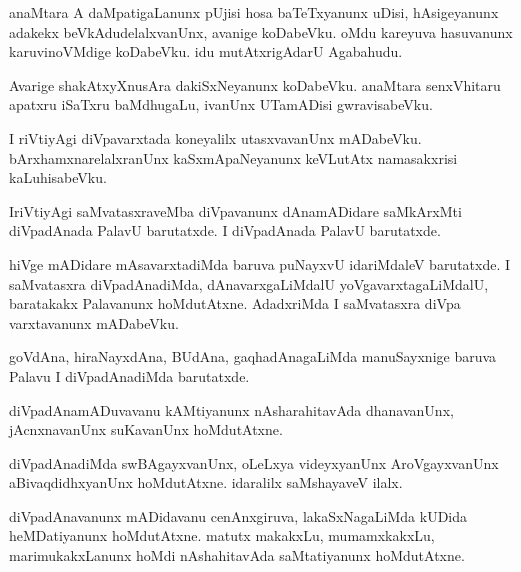 \documentclass{article}
\begin{document}
\begin{mn}%
anaMtara A daMpatigaLanunx pUjisi hosa baTeTxyanunx uDisi, hAsigeyanunx adakekx 
beVkAdudelalxvanUnx, avanige koDabeVku. oMdu kareyuva hasuvanunx karuvinoVMdige koDabeVku. idu 
mutAtxrigAdarU Agabahudu.
\end{mn}

\begin{mn}%
Avarige shakAtxyXnusAra dakiSxNeyanunx koDabeVku. anaMtara senxVhitaru apatxru iSaTxru baMdhugaLu, 
ivanUnx UTamADisi gwravisabeVku.
\end{mn}

\begin{mn}%
I riVtiyAgi diVpavarxtada koneyalilx utasxvavanUnx mADabeVku. bArxhamxnarelalxranUnx 
kaSxmApaNeyanunx keVLutAtx namasakxrisi kaLuhisabeVku.
\end{mn}

\begin{mn}%
IriVtiyAgi saMvatasxraveMba diVpavanunx dAnamADidare saMkArxMti diVpadAnada PalavU barutatxde. I 
diVpadAnada PalavU barutatxde.
\end{mn}

\begin{mn}%
hiVge mADidare mAsavarxtadiMda baruva puNayxvU idariMdaleV barutatxde. I saMvatasxra 
diVpadAnadiMda, dAnavarxgaLiMdalU yoVgavarxtagaLiMdalU, baratakakx Palavanunx hoMdutAtxne. 
AdadxriMda I saMvatasxra diVpa varxtavanunx mADabeVku.
\end{mn}

\begin{mn}%
goVdAna, hiraNayxdAna, BUdAna, gaqhadAnagaLiMda manuSayxnige baruva Palavu I diVpadAnadiMda 
barutatxde.
\end{mn}

\begin{mn}%
diVpadAnamADuvavanu kAMtiyanunx nAsharahitavAda dhanavanUnx, jAcnxnavanUnx suKavanUnx hoMdutAtxne.
\end{mn}

\begin{mn}%
diVpadAnadiMda swBAgayxvanUnx, oLeLxya videyxyanUnx AroVgayxvanUnx aBivaqdidhxyanUnx hoMdutAtxne. 
idaralilx saMshayaveV ilalx.
\end{mn}

\begin{mn}%
diVpadAnavanunx mADidavanu cenAnxgiruva, lakaSxNagaLiMda kUDida heMDatiyanunx hoMdutAtxne. matutx 
makakxLu, mumamxkakxLu, marimukakxLanunx hoMdi nAshahitavAda saMtatiyanunx hoMdutAtxne.
\end{mn}
\end{document}
